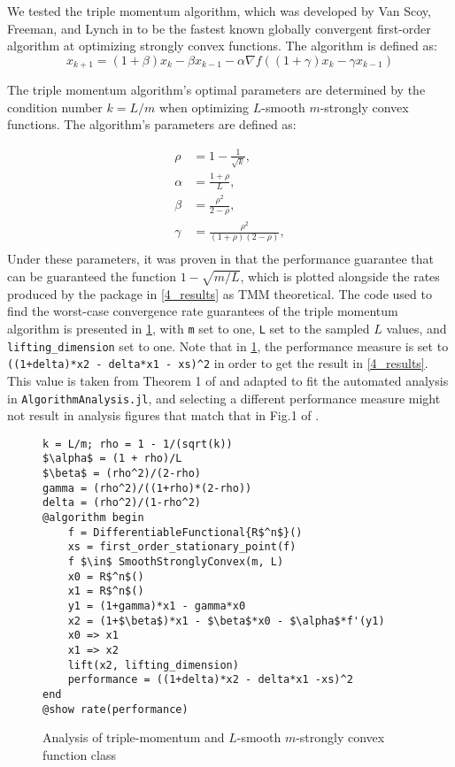 We tested the triple momentum algorithm, which was developed by Van Scoy, Freeman, and Lynch in \cite{TMM} to be the fastest known globally convergent first-order algorithm at optimizing strongly convex functions. The algorithm is defined as:
\begin{equation}\label{eqn:TMM}
 x_{k+1}= (1+\beta)x_{k} - \beta x_{k-1} - \alpha \nabla f((1+\gamma)x_k - \gamma x_{k-1})
  \end{equation}

The triple momentum algorithm's optimal parameters are determined by the condition number \( k = L/m \) when optimizing $L$-smooth $m$-strongly convex functions. The algorithm's parameters are defined as:

\[
\begin{aligned}
\rho &= 1 - \frac{1}{\sqrt{k}}, \\
\alpha &= \frac{1 + \rho}{L}, \\
\beta &= \frac{\rho^2}{2 - \rho}, \\
\gamma &= \frac{\rho^2}{(1 + \rho)(2 - \rho)}, \\
\end{aligned}
\]
Under these parameters, it was proven in \cite{TMM} that the performance guarantee that can be guaranteed the function $1-\sqrt{m/L}$, which is plotted alongside the rates produced by the package in \cref{4_results} as TMM theoretical. The code used to find the worst-case convergence rate guarantees of the triple momentum algorithm is presented in \cref{tmm_code}, with \texttt{m} set to one, \texttt{L} set to the sampled $L$ values, and \texttt{lifting\_dimension} set to one. Note that in \cref{tmm_code}, the performance measure is set to \texttt{((1+delta)*x2 - delta*x1 - xs)\textasciicircum2} in order to get the result in \cref{4_results}. This value is taken from Theorem 1 of \cite{TMM} and adapted to fit the automated analysis in \texttt{AlgorithmAnalysis.jl}, and selecting a different performance measure might not result in analysis figures that match that in Fig.1 of \cite{TMM}.

\begin{figure}[h!]
	\begin{lstlisting}[mathescape]
k = L/m; rho = 1 - 1/(sqrt(k))
$\alpha$ = (1 + rho)/L
$\beta$ = (rho^2)/(2-rho)
gamma = (rho^2)/((1+rho)*(2-rho))
delta = (rho^2)/(1-rho^2)
@algorithm begin
    f = DifferentiableFunctional{R$^n$}()
    xs = first_order_stationary_point(f)
    f $\in$ SmoothStronglyConvex(m, L)
    x0 = R$^n$()
    x1 = R$^n$()
    y1 = (1+gamma)*x1 - gamma*x0
    x2 = (1+$\beta$)*x1 - $\beta$*x0 - $\alpha$*f'(y1)
    x0 => x1
    x1 => x2
    lift(x2, lifting_dimension)
    performance = ((1+delta)*x2 - delta*x1 -xs)^2
end
@show rate(performance)
\end{lstlisting}
\caption{Analysis of triple-momentum and $L$-smooth $m$-strongly convex function class}
\label{tmm_code}
\end{figure}

